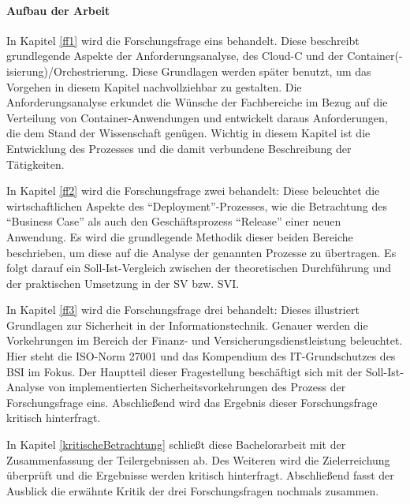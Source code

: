 \paragraph{Aufbau der Arbeit}
In Kapitel \vref{ff1} wird die Forschungsfrage eins behandelt. Diese beschreibt grundlegende Aspekte der Anforderungsanalyse, des \acl{Cloud-C} und der Container(-isierung)/Orchestrierung. Diese Grundlagen werden später benutzt, um das Vorgehen in diesem Kapitel nachvollziehbar zu gestalten. Die Anforderungsanalyse erkundet die Wünsche der Fachbereiche im Bezug auf die Verteilung von Container-Anwendungen und entwickelt daraus Anforderungen, die dem Stand der Wissenschaft genügen. Wichtig in diesem Kapitel ist die Entwicklung des Prozesses und die damit verbundene Beschreibung der Tätigkeiten.
\par
In Kapitel \vref{ff2} wird die Forschungsfrage zwei behandelt: Diese beleuchtet die wirtschaftlichen Aspekte des \enquote{Deployment}-Prozesses, wie die Betrachtung des \enquote{Business Case} als auch den Geschäftsprozess \enquote{Release} einer neuen Anwendung. Es wird die grundlegende Methodik dieser beiden Bereiche beschrieben, um diese auf die Analyse der genannten Prozesse zu übertragen. Es folgt darauf ein Soll-Ist-Vergleich zwischen der theoretischen Durchführung und der praktischen Umsetzung in der \ac{SV} bzw. \ac{SVI}.
\par
In Kapitel \vref{ff3} wird die Forschungsfrage drei behandelt: Dieses illustriert Grundlagen zur Sicherheit in der Informationstechnik. Genauer werden die Vorkehrungen im Bereich der Finanz- und Versicherungsdienstleistung beleuchtet. Hier steht die ISO-Norm 27001 und das Kompendium des IT-Grundschutzes des \ac{BSI} im Fokus. Der Hauptteil dieser Fragestellung beschäftigt sich mit der Soll-Ist-Analyse von implementierten Sicherheitsvorkehrungen des Prozess der Forschungsfrage eins. Abschließend wird das Ergebnis dieser Forschungsfrage kritisch hinterfragt.
\par
In Kapitel \vref{kritischeBetrachtung} schließt diese Bachelorarbeit mit der Zusammenfassung der Teilergebnissen ab. Des Weiteren wird die Zielerreichung überprüft und die Ergebnisse werden kritisch hinterfragt. Abschließend fasst der Ausblick die erwähnte Kritik der drei Forschungsfragen nochmals zusammen. 
